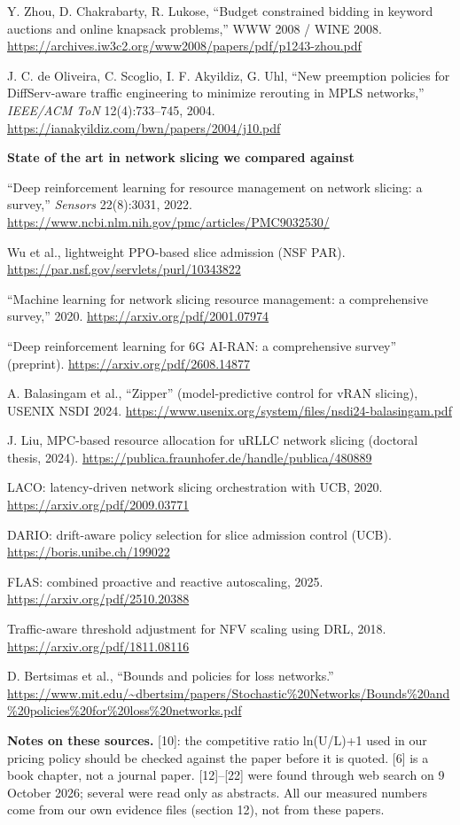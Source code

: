 \documentclass[11pt]{article}
\begin{document}
{\begin{enumerate}[label={[\arabic*]},leftmargin=2.2em,resume]
  \item Y. Zhou, D. Chakrabarty, R. Lukose, ``Budget constrained bidding in keyword auctions and online knapsack problems,'' WWW 2008 / WINE 2008. \url{https://archives.iw3c2.org/www2008/papers/pdf/p1243-zhou.pdf}
  \item J. C. de Oliveira, C. Scoglio, I. F. Akyildiz, G. Uhl, ``New preemption policies for DiffServ-aware traffic engineering to minimize rerouting in MPLS networks,'' \emph{IEEE/ACM ToN} 12(4):733--745, 2004. \url{https://ianakyildiz.com/bwn/papers/2004/j10.pdf}
\end{enumerate}
\textbf{State of the art in network slicing we compared against}
\begin{enumerate}[label={[\arabic*]},leftmargin=2.2em,resume]
  \item ``Deep reinforcement learning for resource management on network slicing: a survey,'' \emph{Sensors} 22(8):3031, 2022. \url{https://www.ncbi.nlm.nih.gov/pmc/articles/PMC9032530/}
  \item Wu et al., lightweight PPO-based slice admission (NSF PAR). \url{https://par.nsf.gov/servlets/purl/10343822}
  \item ``Machine learning for network slicing resource management: a comprehensive survey,'' 2020. \url{https://arxiv.org/pdf/2001.07974}
  \item ``Deep reinforcement learning for 6G AI-RAN: a comprehensive survey'' (preprint). \url{https://arxiv.org/pdf/2608.14877}
  \item A. Balasingam et al., ``Zipper'' (model-predictive control for vRAN slicing), USENIX NSDI 2024. \url{https://www.usenix.org/system/files/nsdi24-balasingam.pdf}
  \item J. Liu, MPC-based resource allocation for uRLLC network slicing (doctoral thesis, 2024). \url{https://publica.fraunhofer.de/handle/publica/480889}
  \item LACO: latency-driven network slicing orchestration with UCB, 2020. \url{https://arxiv.org/pdf/2009.03771}
  \item DARIO: drift-aware policy selection for slice admission control (UCB). \url{https://boris.unibe.ch/199022}
  \item FLAS: combined proactive and reactive autoscaling, 2025. \url{https://arxiv.org/pdf/2510.20388}
  \item Traffic-aware threshold adjustment for NFV scaling using DRL, 2018. \url{https://arxiv.org/pdf/1811.08116}
  \item D. Bertsimas et al., ``Bounds and policies for loss networks.'' \url{https://www.mit.edu/~dbertsim/papers/Stochastic\%20Networks/Bounds\%20and\%20policies\%20for\%20loss\%20networks.pdf}
\end{enumerate}
\textbf{Notes on these sources.} [10]: the competitive ratio ln(U/L)+1 used in our pricing policy should be checked against the paper before it is quoted. [6] is a book chapter, not a journal paper. [12]--[22] were found through web search on 9 October 2026; several were read only as abstracts. All our measured numbers come from our own evidence files (section 12), not from these papers.
}
\end{document}
